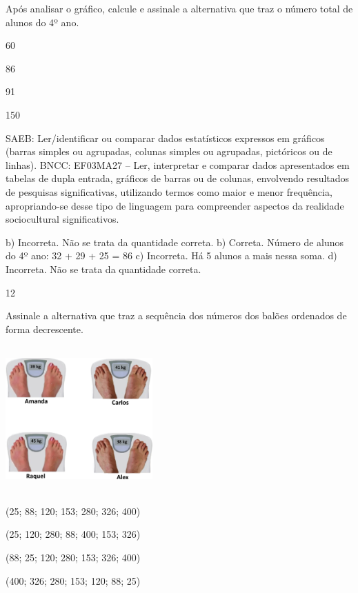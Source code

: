 {\begin{escolha}
{Após analisar o gráfico, calcule e assinale a alternativa que traz o número total de alunos do 4º ano.

\begin{escolha}
\item
  60
\item
  86
\item
  91
\item
  150
\end{escolha}

SAEB: Ler/identificar ou comparar dados estatísticos
expressos em gráficos (barras simples ou agrupadas, colunas simples ou
agrupadas, pictóricos ou de linhas).
BNCC: EF03MA27 -- Ler, interpretar e comparar dados apresentados em tabelas de dupla entrada,
gráficos de barras ou de colunas, envolvendo resultados de pesquisas significativas, utilizando
termos como maior e menor frequência, apropriando-se desse tipo de linguagem para
compreender aspectos da realidade sociocultural significativos.

b) Incorreta. Não se trata da quantidade correta.
b) Correta. Número de alunos do 4º ano: 32 + 29 + 25 = 86 
c) Incorreta. Há 5 alunos a mais nessa soma.
d) Incorreta. Não se trata da quantidade correta.

\num{12}

Assinale a alternativa que traz a sequência dos números dos balões ordenados de forma decrescente.


\includegraphics[width=2.21686in,height=2.20852in]{media/image113.png}

\begin{escolha}
\item
  (25; 88; 120; 153; 280; 326; 400)
\item
  (25; 120; 280; 88; 400; 153; 326)
\item
  (88; 25; 120; 280; 153; 326; 400)
\item
  (400; 326; 280; 153; 120; 88; 25)
\end{escolha}

}
\end{escolha}}
